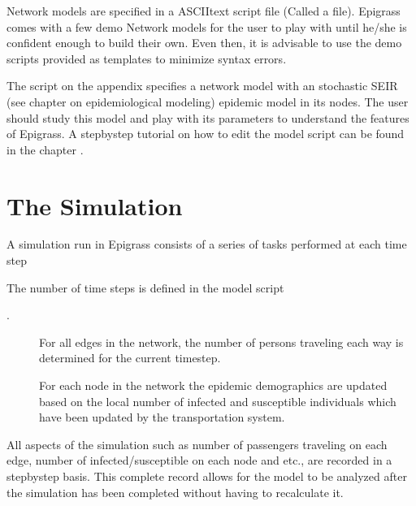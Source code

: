 \documentclass[letterpaper,10pt,english]{sphinxmanual}
\begin{document}
\ignorespaces 
Network models are specified in a ASCII\sphinxhyphen{}text script file (Called a  file). Epigrass comes with a few demo
Network models for the user to play with until he/she is confident enough to build their own. Even then, it is
advisable to use the demo scripts provided as templates to minimize syntax errors.

The script on the appendix  specifies a network model with an stochastic SEIR (see chapter on epidemiological modeling)
epidemic model in its nodes. The user should study this model and play with its parameters to understand the features
of Epigrass. A step\sphinxhyphen{}by\sphinxhyphen{}step tutorial on how to edit the model script can be found in the chapter .


\section{The Simulation}
\label{\detokenize{overview:the-simulation}}
A simulation run in Epigrass consists of a series of tasks performed at each time step %
\begin{footnote}[1]\sphinxAtStartFootnote
The number of time steps is defined in the model script
%
\end{footnote} .
\begin{description}
\item[{}] \leavevmode
For all edges in the network, the number of persons traveling each way is determined for the current time\sphinxhyphen{}step.

\item[{}] \leavevmode
For each node in the network the epidemic demographics are updated based on the local number of infected and susceptible individuals which have been updated by the transportation system.

\end{description}

All aspects of the simulation such as number of passengers traveling on each edge, number of infected/susceptible on each node and etc., are recorded in a step\sphinxhyphen{}by\sphinxhyphen{}step basis. This complete record allows for the model to be analyzed after the simulation has been completed without having to recalculate it.
\end{document}
